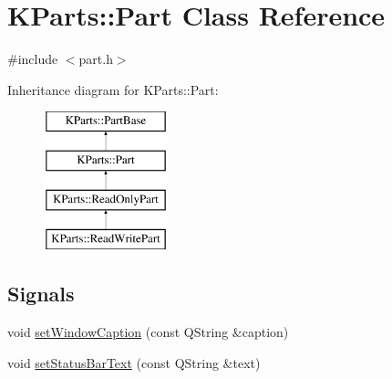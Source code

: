 \hypertarget{classKParts_1_1Part}{\section{\-K\-Parts\-:\-:\-Part \-Class \-Reference}
\label{classKParts_1_1Part}
}


{\ttfamily \#include $<$part.\-h$>$}

\-Inheritance diagram for \-K\-Parts\-:\-:\-Part\-:\begin{figure}[H]
\begin{center}
\leavevmode
\includegraphics[height=4.000000cm]{classKParts_1_1Part}
\end{center}
\end{figure}
\subsection*{\-Signals}
\begin{DoxyCompactItemize}
\item 
void \hyperlink{classKParts_1_1Part_a00982292ef3d8b80dedeb5fed2376099}{set\-Window\-Caption} (const \-Q\-String \&caption)
\item 
void \hyperlink{classKParts_1_1Part_a809740a79edf0fa0bbe1dd982a6c4d35}{set\-Status\-Bar\-Text} (const \-Q\-String \&text)
\end{DoxyCompactItemize}
